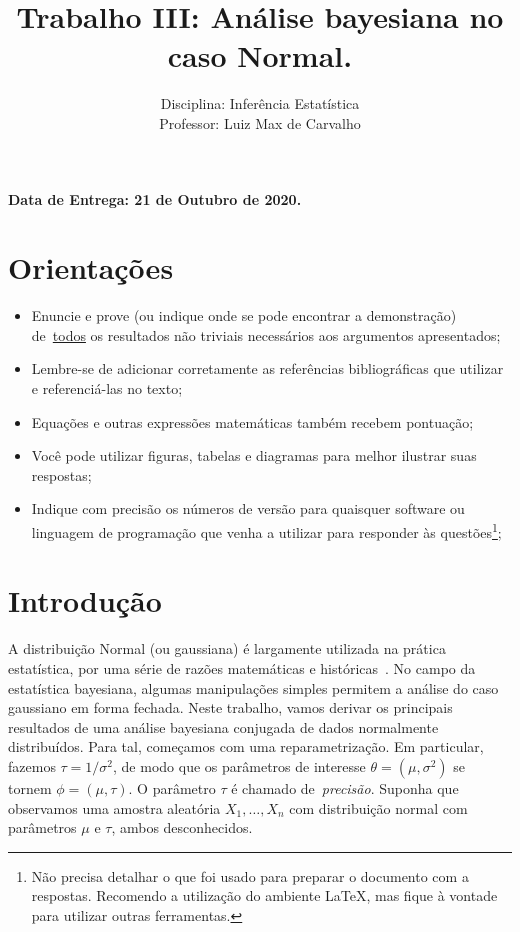 \documentclass[a4paper,10pt, notitlepage]{report}
\title{Trabalho III: Análise bayesiana no caso Normal.}
\author{Disciplina: Inferência Estatística \\ Professor: Luiz Max de Carvalho}
\begin{document}
\maketitle

\textbf{Data de Entrega: 21 de Outubro de 2020.}

\section*{Orientações}
\begin{itemize}
 \item Enuncie e prove (ou indique onde se pode encontrar a demonstração) de~\underline{todos} os resultados não triviais necessários aos argumentos apresentados;
 \item Lembre-se de adicionar corretamente as referências bibliográficas que utilizar e referenciá-las no texto;
 \item Equações e outras expressões matemáticas também recebem pontuação;
 \item Você pode utilizar figuras, tabelas e diagramas para melhor ilustrar suas respostas;
 \item Indique com precisão os números de versão para quaisquer software ou linguagem de programação que venha a utilizar para responder às questões\footnote{Não precisa detalhar o que foi usado para preparar o documento com a respostas. Recomendo a utilização do ambiente LaTeX, mas fique à vontade para utilizar outras ferramentas.};
 \end{itemize}


\section*{Introdução}

A distribuição Normal (ou gaussiana) é largamente utilizada na prática estatística, por uma série de razões matemáticas e históricas~\citep{Kim2008}.
No campo da estatística bayesiana, algumas manipulações simples permitem a análise do caso gaussiano em forma fechada.
Neste trabalho, vamos derivar os principais resultados de uma análise bayesiana conjugada de dados normalmente distribuídos.
Para tal, começamos com uma reparametrização.
Em particular, fazemos $\tau = 1/\sigma^2$, de modo que os parâmetros de interesse $\theta = (\mu, \sigma^2)$ se tornem $\phi = (\mu, \tau)$.
O parâmetro $\tau$ é chamado de~\textit{precisão}.
Suponha que observamos uma amostra aleatória $X_1, \ldots, X_n$ com distribuição normal com parâmetros $\mu$ e $\tau$, ambos desconhecidos.
\end{document}
